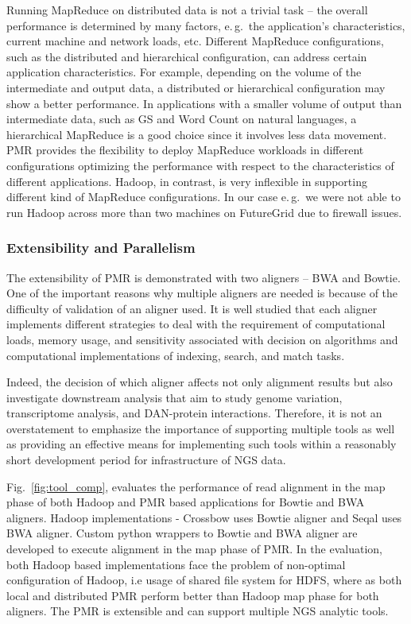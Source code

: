 \documentclass[12pt]{report}
\begin{document}
Running MapReduce on distributed data is not a trivial task -- the overall
performance is determined by many factors, e.\,g.\ the application's
characteristics, current machine and network loads, etc. Different MapReduce
configurations, such as the distributed and hierarchical configuration, can
address certain application characteristics. For example, depending on the
volume of the intermediate and output data, a distributed or hierarchical
configuration may show a better performance. In applications with a smaller
volume of output than intermediate data, such as GS and Word Count on natural
languages, a hierarchical MapReduce is a good choice since it involves less data
movement. PMR provides the flexibility to deploy MapReduce workloads in
different configurations optimizing the performance with respect to the
characteristics of different applications. Hadoop, in contrast, is very
inflexible in supporting different kind of MapReduce configurations. In our case
e.\,g.\ we were not able to run Hadoop across more than two machines on
FutureGrid due to firewall issues.


\subsubsection{Extensibility and Parallelism}
The extensibility of PMR is demonstrated with two aligners -- BWA and
Bowtie.  One of the important reasons why multiple aligners are needed
is because of the difficulty of validation of an aligner used\cite{mapping-survey}.  It is
well studied that each aligner implements different strategies to deal
with the requirement of computational loads, memory usage, and
sensitivity associated with decision on algorithms and computational
implementations of indexing, search, and match
tasks.

Indeed, the decision of which aligner affects not only alignment
results but also investigate downstream analysis that aim to study
genome variation, transcriptome analysis, and DAN-protein
interactions. Therefore, it is not an overstatement to emphasize the
importance of supporting multiple tools as well as providing an
effective means for implementing such tools within a reasonably short
development period for infrastructure of NGS data.

Fig.~\ref{fig:tool_comp}, evaluates the performance of read alignment
in the map phase of both Hadoop and PMR based applications for Bowtie
and BWA aligners. Hadoop implementations - Crossbow uses Bowtie
aligner and Seqal uses BWA aligner.  Custom python wrappers to Bowtie
and BWA aligner are developed to execute alignment in the map phase of
PMR. In the evaluation, both Hadoop based implementations face the
problem of non-optimal configuration of Hadoop, i.e usage of shared
file system for HDFS, where as both local and distributed PMR perform
better than Hadoop map phase for both aligners. The PMR is extensible
and can support multiple NGS analytic tools.
\end{document}
